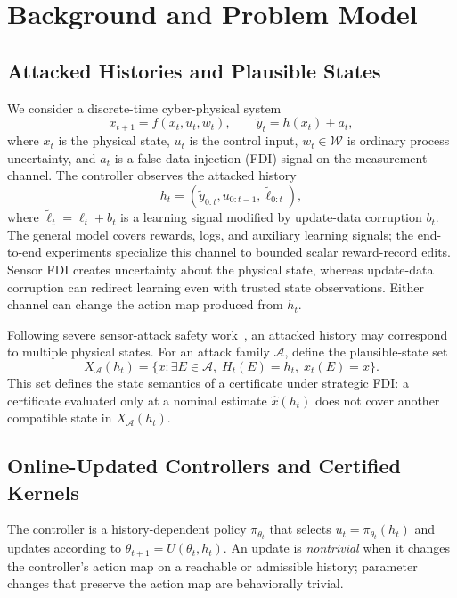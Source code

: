 \section{Background and Problem Model}
\label{sec:model}

\subsection{Attacked Histories and Plausible States}

We consider a discrete-time cyber-physical system
\begin{equation}
    x_{t+1}=f(x_t,u_t,w_t), \qquad
    \widetilde y_t=h(x_t)+a_t,
\end{equation}
where $x_t$ is the physical state, $u_t$ is the control input,
$w_t\in\mathcal W$ is ordinary process uncertainty, and $a_t$ is a
false-data injection (FDI) signal on the measurement channel.  The controller
observes the attacked history
\begin{equation}
    h_t=(\widetilde y_{0:t},u_{0:t-1},\widetilde\ell_{0:t}),
\end{equation}
where $\widetilde\ell_t=\ell_t+b_t$ is a learning signal modified by
update-data corruption $b_t$.  The general model covers rewards, logs, and
auxiliary learning signals; the end-to-end experiments specialize this channel
to bounded scalar reward-record edits.  Sensor FDI creates uncertainty about
the physical state, whereas update-data corruption can redirect learning even
with trusted state observations.  Either channel can change the action map
produced from $h_t$.

Following severe sensor-attack safety work~\cite{tan_safety_2024}, an attacked
history may correspond to multiple physical states.  For an attack family
$\mathcal A$, define the plausible-state set
\begin{equation}
    X_{\mathcal A}(h_t)=\{x:\exists E\in\mathcal A,\; H_t(E)=h_t,\; x_t(E)=x\}.
\end{equation}
This set defines the state semantics of a certificate under strategic FDI: a
certificate evaluated only at a nominal estimate $\hat x(h_t)$ does not cover
another compatible state in $X_{\mathcal A}(h_t)$.

\subsection{Online-Updated Controllers and Certified Kernels}

The controller is a history-dependent policy $\pi_{\theta_t}$ that selects
$u_t=\pi_{\theta_t}(h_t)$ and updates according to
$\theta_{t+1}=U(\theta_t,h_t)$.  An update is \emph{nontrivial} when it
changes the controller's action map on a reachable or admissible history;
parameter changes that preserve the action map are behaviorally trivial.

